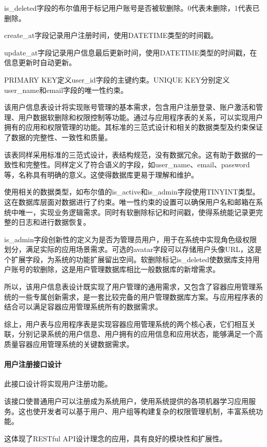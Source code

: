 \documentclass{HDU-Bachelor-Thesis}
\begin{document}
is\_deleted字段的布尔值用于标记用户账号是否被软删除。0代表未删除，1代表已删除。

create\_at字段记录用户注册时间，使用DATETIME类型的时间戳。

update\_at字段记录用户信息最后更新时间，使用DATETIME类型的时间戳，在信息更新时自动更新。

PRIMARY KEY定义user\_id字段的主键约束。UNIQUE KEY分别定义user\_name和email字段的唯一性约束。

该用户信息表设计将实现账号管理的基本需求，包含用户注册登录、账户激活和管理、用户数据软删除和权限控制等功能。通过与应用程序表的关系，可以实现用户拥有的应用和权限管理的功能。其标准的三范式设计和相关的数据类型及约束保证了数据的完整性、一致性和质量。

该表同样采用标准的三范式设计，表结构规范，没有数据冗余。这有助于数据的一致性和完整性。同样定义了符合语义的字段，如user\_name、email、password等，名称具有明确的意义。这使得数据库更易于理解和维护。

使用相关的数据类型，如布尔值的is\_active和is\_admin字段使用TINYINT类型。这在数据库层面对数据进行了约束。唯一性约束的设置可以确保用户名和邮箱在系统中唯一，实现业务逻辑需求。同时有软删除标记和时间戳，使得系统能记录更完整的日志和进行数据恢复。

is\_admin字段创新性的定义为是否为管理员用户，用于在系统中实现角色级权限划分，满足实际的应用场景需求。可选的avatar字段可以存储用户头像URL，这是个扩展字段，为系统的功能扩展留出空间。软删除标记is\_deleted使数据库支持用户账号的软删除，这是用户管理数据库相比一般数据库的新增需求。

所以，该用户信息表设计既实现了用户管理的通用需求，又包含了容器应用管理系统的一些专属创新需求，是一套比较完备的用户管理数据库方案。与应用程序表的结合可以满足容器应用管理系统所有的数据需求。

综上，用户表与应用程序表是实现容器应用管理系统的两个核心表，它们相互关联，分别记录系统的用户信息、用户拥有的应用信息和应用状态，能够满足一个高质量容器应用管理系统的关键数据需求。

\paragraph{用户注册接口设计}

此接口设计将实现用户注册功能。

该接口使普通用户可以注册成为系统用户，使用系统提供的各项机器学习应用服务。这也使开发者可以基于用户、用户组等构建复杂的权限管理机制，丰富系统功能。

这体现了RESTful API设计理念的应用，具有良好的模块性和扩展性。
\end{document}
